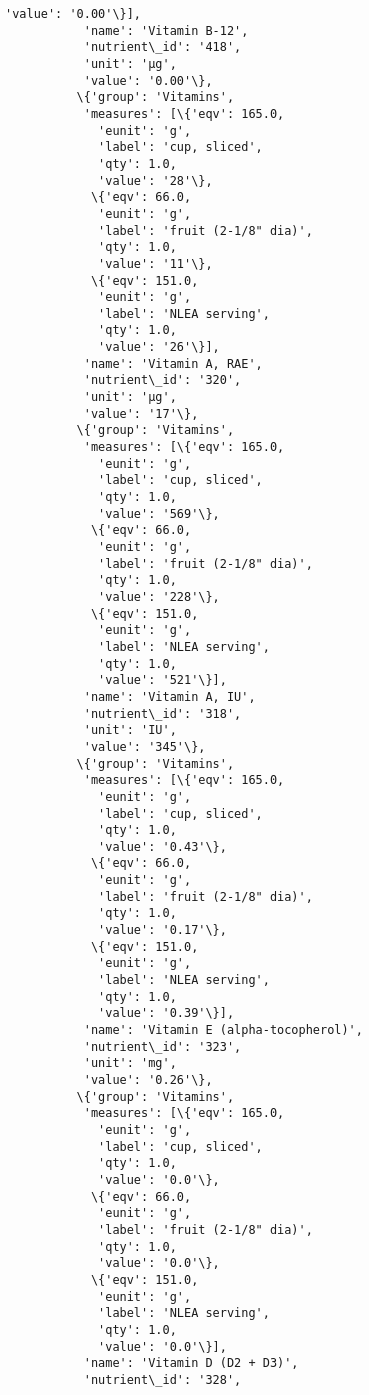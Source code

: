 \documentclass[11pt]{article}
\begin{document}
\begin{Verbatim}[commandchars=\\\{\}]
             'value': '0.00'\}],
           'name': 'Vitamin B-12',
           'nutrient\_id': '418',
           'unit': 'µg',
           'value': '0.00'\},
          \{'group': 'Vitamins',
           'measures': [\{'eqv': 165.0,
             'eunit': 'g',
             'label': 'cup, sliced',
             'qty': 1.0,
             'value': '28'\},
            \{'eqv': 66.0,
             'eunit': 'g',
             'label': 'fruit (2-1/8" dia)',
             'qty': 1.0,
             'value': '11'\},
            \{'eqv': 151.0,
             'eunit': 'g',
             'label': 'NLEA serving',
             'qty': 1.0,
             'value': '26'\}],
           'name': 'Vitamin A, RAE',
           'nutrient\_id': '320',
           'unit': 'µg',
           'value': '17'\},
          \{'group': 'Vitamins',
           'measures': [\{'eqv': 165.0,
             'eunit': 'g',
             'label': 'cup, sliced',
             'qty': 1.0,
             'value': '569'\},
            \{'eqv': 66.0,
             'eunit': 'g',
             'label': 'fruit (2-1/8" dia)',
             'qty': 1.0,
             'value': '228'\},
            \{'eqv': 151.0,
             'eunit': 'g',
             'label': 'NLEA serving',
             'qty': 1.0,
             'value': '521'\}],
           'name': 'Vitamin A, IU',
           'nutrient\_id': '318',
           'unit': 'IU',
           'value': '345'\},
          \{'group': 'Vitamins',
           'measures': [\{'eqv': 165.0,
             'eunit': 'g',
             'label': 'cup, sliced',
             'qty': 1.0,
             'value': '0.43'\},
            \{'eqv': 66.0,
             'eunit': 'g',
             'label': 'fruit (2-1/8" dia)',
             'qty': 1.0,
             'value': '0.17'\},
            \{'eqv': 151.0,
             'eunit': 'g',
             'label': 'NLEA serving',
             'qty': 1.0,
             'value': '0.39'\}],
           'name': 'Vitamin E (alpha-tocopherol)',
           'nutrient\_id': '323',
           'unit': 'mg',
           'value': '0.26'\},
          \{'group': 'Vitamins',
           'measures': [\{'eqv': 165.0,
             'eunit': 'g',
             'label': 'cup, sliced',
             'qty': 1.0,
             'value': '0.0'\},
            \{'eqv': 66.0,
             'eunit': 'g',
             'label': 'fruit (2-1/8" dia)',
             'qty': 1.0,
             'value': '0.0'\},
            \{'eqv': 151.0,
             'eunit': 'g',
             'label': 'NLEA serving',
             'qty': 1.0,
             'value': '0.0'\}],
           'name': 'Vitamin D (D2 + D3)',
           'nutrient\_id': '328',

\end{Verbatim}
\end{document}
